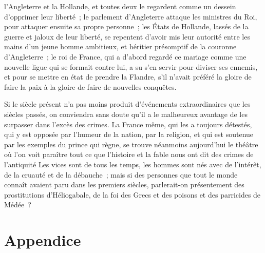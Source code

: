 \documentclass[french,twoside]{book} %
\begin{document}
l’Angleterre et la Hollande, et toutes deux le regardent comme un dessein d’opprimer leur liberté ; le parlement d’Angleterre attaque les ministres du Roi, pour attaquer ensuite sa propre personne ; les États de Hollande, lassés de la guerre et jaloux de leur liberté, se repentent d’avoir mis leur autorité entre les mains d’un jeune homme ambitieux, et héritier présomptif de la couronne d’Angleterre ; le roi de France, qui a d’abord regardé ce mariage comme une nouvelle ligue qui se formait contre lui, a su s’en servir pour diviser ses ennemis, et pour se mettre en état de prendre la Flandre, s’il n’avait préféré la gloire de faire la paix à la gloire de faire de nouvelles conquêtes.\par
Si le siècle présent n’a pas moins produit d’événements extraordinaires que les siècles passés, on conviendra sans doute qu’il a le malheureux avantage de les surpasser dans l’excès des crimes. La France même, qui les a toujours détestés, qui y est opposée par l’humeur de la nation, par la religion, et qui est soutenue par les exemples du prince qui règne, se trouve néanmoins aujourd’hui le théâtre où l’on voit paraître tout ce que l’histoire et la fable nous ont dit des crimes de l’antiquité Les vices sont de tous les temps, les hommes sont nés avec de l’intérêt, de la cruauté et de la débauche ; mais si des personnes que tout le monde connaît avaient paru dans les premiers siècles, parlerait-on présentement des prostitutions d’Héliogabale, de la foi des Grecs et des poisons et des parricides de Médée ?
\section[{Appendice}]{Appendice}\renewcommand{\leftmark}{Appendice}
\end{document}
